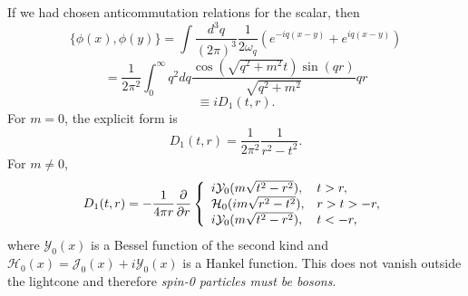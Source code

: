 \documentclass[11pt]{article}
\theoremstyle{definition}
\begin{document}
If we had chosen anticommutation relations for the scalar, then
\begin{equation}
\{\phi(x),\phi(y)\} =\int\frac{d^{3}q}{(2\pi)^{3}}\frac{1}{2\omega_{q}}\left(e^{-iq(x-y) }+e^{iq(x-y)}\right)
\end{equation}
\begin{equation}
=\frac{1}{2\pi^{2}}\int_{0}^{\infty}q^{2}dq\frac{\cos(\sqrt{q^{2}+m ^{2}}t)\sin(qr)}{\sqrt{q^{2}+m^{2}}}qr
\end{equation}
\begin{equation}
\equiv iD_{1}(t,r).
\end{equation}
For \(m=0\), the explicit form is
\begin{equation}
D_{1}(t,r)=\frac{1}{2\pi^{2}}\frac{1}{r^{2}-t^{2}}.
\end{equation}
For \(m\neq 0\),
\begin{equation}
D_{1}(t,r)=-\frac{1}{4\pi r}\frac{\partial}{\partial r}\left\{\begin{array}[]{ ll}i\mathcal{Y}_{0}(m\sqrt{t^{2}-r^{2}}),&t>r,\\ \mathcal{H}_{0}(im\sqrt{r^{2}-t^{2}}),&r>t>-r,\\ i\mathcal{Y}_{0}(m\sqrt{t^{2}-r^{2}}),&t<-r,\end{array}\right.
\end{equation}
where \(\mathcal{Y}_{0}(x)\) is a Bessel function of the second kind and \(\mathcal{H}_{0}(x)=\mathcal{J}_{0}(x)+i\mathcal{Y}_{0}(x)\) is a Hankel function. This does not vanish outside the lightcone and therefore \emph{spin-0 particles must be bosons}.
\end{document}
